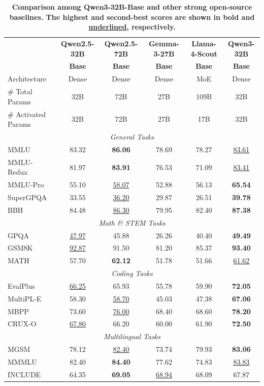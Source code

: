 \begin{table}[tbp]
\centering
\caption{\textbf{Comparison among Qwen3-32B-Base and other strong open-source baselines. The highest and second-best scores are shown in \textbf{bold} and \underline{underlined}, respectively.}}
\label{tab:base-32B}
\small
\begin{tabular}{@{}lccccc@{}}
\toprule
 & \textbf{Qwen2.5-32B} & \textbf{Qwen2.5-72B} & \textbf{Gemma-3-27B} & \textbf{Llama-4-Scout} & \textbf{Qwen3-32B} \\
 & \textbf{Base} & \textbf{Base} & \textbf{Base} & \textbf{Base}& \textbf{Base} \\
\midrule
Architecture & Dense & Dense & Dense & MoE & Dense\\
\# Total Params & 32B & 72B & 27B & 109B & 32B\\
\# Activated Params & 32B & 72B & 27B & 17B & 32B\\
\midrule
\multicolumn{6}{c}{\textit{General Tasks}} \\
\midrule
MMLU & 83.32 & \textbf{86.06} & 78.69 & 78.27 & \underline{83.61} \\
MMLU-Redux & 81.97 & \textbf{83.91} & 76.53 & 71.09 & \underline{83.41} \\
MMLU-Pro & 55.10 & \underline{58.07} & 52.88 & 56.13 & \textbf{65.54} \\
SuperGPQA & 33.55 & \underline{36.20} & 29.87 & 26.51 & \textbf{39.78} \\
BBH & 84.48 & \underline{86.30} & 79.95 & 82.40 & \textbf{87.38} \\
\midrule
\multicolumn{6}{c}{\textit{Math \& STEM Tasks}} \\
\midrule
GPQA & \underline{47.97} & 45.88 & 26.26 & 40.40 & \textbf{49.49} \\
GSM8K & \underline{92.87} & 91.50 & 81.20 & 85.37 & \textbf{93.40} \\
MATH & 57.70 & \textbf{62.12} & 51.78 & 51.66 & \underline{61.62} \\
\midrule
\multicolumn{6}{c}{\textit{Coding Tasks}} \\
\midrule
EvalPlus & \underline{66.25} & 65.93 & 55.78 & 59.90 & \textbf{72.05} \\
MultiPL-E & 58.30 & \underline{58.70} & 45.03 & 47.38 & \textbf{67.06} \\
MBPP & 73.60 & \underline{76.00} & 68.40 & 68.60 & \textbf{78.20} \\
CRUX-O & \underline{67.80} & 66.20 & 60.00 & 61.90 & \textbf{72.50} \\
\midrule
\multicolumn{6}{c}{\textit{Multilingual Tasks}} \\
\midrule
MGSM & 78.12 & \underline{82.40} & 73.74 & 79.93 & \textbf{83.06} \\
MMMLU & 82.40 & \textbf{84.40} & 77.62 & 74.83 & \underline{83.83} \\
INCLUDE & 64.35 & \textbf{69.05} & \underline{68.94} & 68.09 & 67.87 \\
\bottomrule
\end{tabular}
\end{table}


